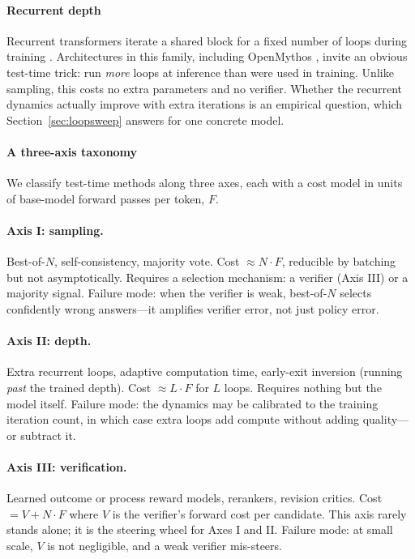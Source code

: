 \paragraph{Recurrent depth}

Recurrent transformers iterate a shared block for a fixed number of
loops during training \citep{dehghani2019universal}. Architectures in
this family, including OpenMythos \citep{gomez2024openmythos}, invite an
obvious test-time trick: run \emph{more} loops at inference than were
used in training. Unlike sampling, this costs no extra parameters and
no verifier. Whether the recurrent dynamics actually improve with extra
iterations is an empirical question, which Section~\ref{sec:loopsweep} answers for one
concrete model.

\paragraph{A three-axis taxonomy}

We classify test-time methods along three axes, each with a cost model
in units of base-model forward passes per token, $F$.

\paragraph{Axis I: sampling.} Best-of-$N$, self-consistency, majority
vote. Cost $\approx N \cdot F$, reducible by batching but not
asymptotically. Requires a selection mechanism: a verifier (Axis III) or
a majority signal. Failure mode: when the verifier is weak, best-of-$N$
selects confidently wrong answers---it amplifies verifier error, not
just policy error.

\paragraph{Axis II: depth.} Extra recurrent loops, adaptive computation
time, early-exit inversion (running \emph{past} the trained depth).
Cost $\approx L \cdot F$ for $L$ loops. Requires nothing but the model
itself. Failure mode: the dynamics may be calibrated to the training
iteration count, in which case extra loops add compute without adding
quality---or subtract it.

\paragraph{Axis III: verification.} Learned outcome or process reward
models, rerankers, revision critics. Cost $= V + N \cdot F$ where $V$ is
the verifier's forward cost per candidate. This axis rarely stands
alone; it is the steering wheel for Axes I and II. Failure mode: at
small scale, $V$ is not negligible, and a weak verifier mis-steers.

